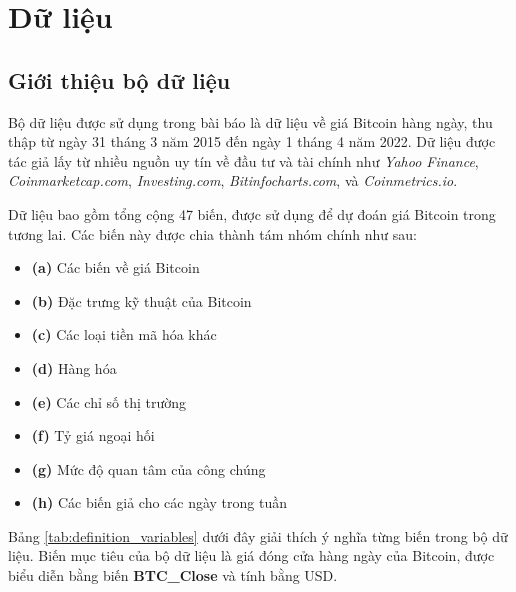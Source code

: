 \chapter{Dữ liệu}
\section{Giới thiệu bộ dữ liệu}

Bộ dữ liệu được sử dụng trong bài báo là dữ liệu về giá Bitcoin hàng ngày, thu thập từ ngày 31 tháng 3 năm 2015 đến ngày 1 tháng 4 năm 2022. Dữ liệu được tác giả lấy từ nhiều nguồn uy tín về đầu tư và tài chính như \textit{Yahoo Finance}, \textit{Coinmarketcap.com}, \textit{Investing.com}, \textit{Bitinfocharts.com}, và \textit{Coinmetrics.io}. 

Dữ liệu bao gồm tổng cộng 47 biến, được sử dụng để dự đoán giá Bitcoin trong tương lai. Các biến này được chia thành tám nhóm chính như sau:

\begin{itemize}
    \item \textbf{(a)} Các biến về giá Bitcoin
    \item \textbf{(b)} Đặc trưng kỹ thuật của Bitcoin
    \item \textbf{(c)} Các loại tiền mã hóa khác
    \item \textbf{(d)} Hàng hóa
    \item \textbf{(e)} Các chỉ số thị trường
    \item \textbf{(f)} Tỷ giá ngoại hối
    \item \textbf{(g)} Mức độ quan tâm của công chúng
    \item \textbf{(h)} Các biến giả cho các ngày trong tuần
\end{itemize}

Bảng \ref{tab:definition_variables} dưới đây giải thích ý nghĩa từng biến trong bộ dữ liệu. Biến mục tiêu của bộ dữ liệu là giá đóng cửa hàng ngày của Bitcoin, được biểu diễn bằng biến \textbf{BTC\_Close} và tính bằng USD.

